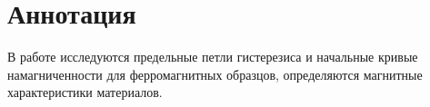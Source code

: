 \section*{Аннотация}

В работе исследуются предельные петли гистерезиса и начальные кривые намагниченности для ферромагнитных образцов, определяются магнитные характеристики материалов.